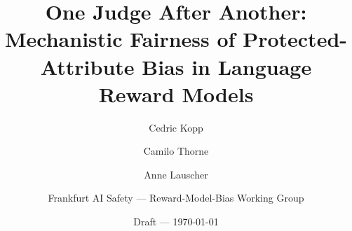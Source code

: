 \documentclass{article}
\title{One Judge After Another:\\ Mechanistic Fairness of Protected-Attribute Bias in Language Reward Models}
\author{Cedric Kopp \and Camilo Thorne \and Anne Lauscher \and Frankfurt AI Safety --- Reward-Model-Bias Working Group}
\date{Draft --- \today}
\begin{document}
\maketitle

\begin{abstract}

\end{abstract}













\appendix

\end{document}
